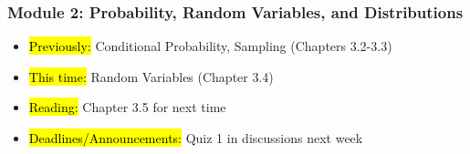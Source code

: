 
\begin{frame}
    \frametitle{Module 2: Probability, Random Variables, and Distributions}
    \begin{itemize}
        \item \hl{Previously: } Conditional Probability, Sampling (Chapters 3.2-3.3)
        \item \hl{This time: } Random Variables (Chapter 3.4)
        \item \hl{Reading: } Chapter 3.5 for next time
        \item \hl{Deadlines/Announcements: } Quiz 1 in discussions next week
    \end{itemize}
    
\end{frame}
    
